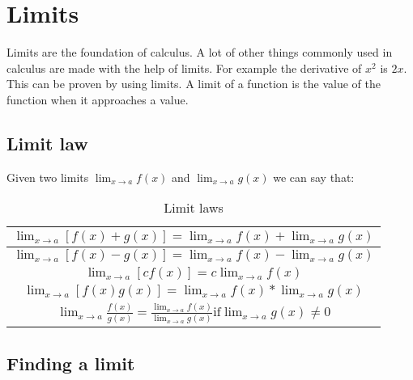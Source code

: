 \section{Limits}
Limits are the foundation of calculus.
A lot of other things commonly used in calculus are made with the help of limits.
For example the derivative of \(x^2\) is \(2x\).
This can be proven by using limits.
A limit of a function is the value of the function when it approaches a value.

\subsection{Limit law}

Given two limits \(\lim_{x \to a} f(x)\) and \(\lim_{x \to a} g(x)\) we can say that:

\begin{table}[h]
	\centering
	\begin{tabular} {c}
    \(\lim_{x \to a} [f(x) + g(x)] = \lim_{x \to a} f(x) + \lim_{x \to a} g(x)\) \\\hline
    \(\lim_{x \to a} [f(x) - g(x)] = \lim_{x \to a} f(x) - \lim_{x \to a} g(x)\) \\\hline
    \(\lim_{x \to a} [c f(x)] = c \lim_{x \to a} f(x)\) \\\hline
    \(\lim_{x \to a} [f(x)g(x)] = \lim_{x \to a} f(x) * \lim_{x \to a} g(x)\) \\\hline
    \(\lim_{x \to a} \frac{f(x)}{g(x)} = \frac{\lim_{x \to a} f(x)}{\lim_{x \to a} g(x)} \text{if} \lim_{x \to a} g(x) \neq 0\) \\
	\end{tabular}
	\caption{Limit laws}
\end{table}

\subsection{Finding a limit}
\begin{figure}[h]
  \begin{center}
  \end{center}
\end{figure}

